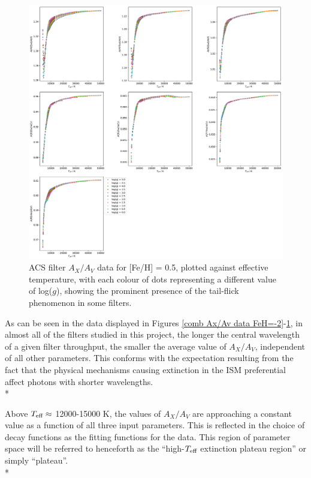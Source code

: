 \documentclass[12pt, a4paper]{report}
\begin{document}
\begin{figure}[h]
\begin{center}
\includegraphics[scale=0.3]{../just_full_data/ACS/AHub_FeH0p5_just_Teff_fit_plot_dots.pdf}
\caption{ACS filter $A_{X}/A_{V}$ data for [Fe/H] = 0.5, plotted against effective temperature, with each colour of dots representing a different value of log($g$), showing the prominent presence of the tail-flick phenomenon in some filters.}
\label{acs Ax/Av data FeH=0}
\end{center}
\end{figure}

As can be seen in the data displayed in Figures \ref{comb Ax/Av data FeH=-2}-\ref{acs Ax/Av data FeH=0}, in almost all of the filters studied in this project, the longer the central wavelength of a given filter throughput, the smaller the average value of $A_{X}/A_{V}$, independent of all other parameters. This conforms with the expectation resulting from the fact that the physical mechanisms causing extinction in the ISM preferential affect photons with shorter wavelengths.\\*

Above $T_{\textnormal{eff}} \approx$ 12000-15000 K, the values of $A_{X}/A_{V}$ are approaching a constant value as a function of all three input parameters. This is reflected in the choice of decay functions as the fitting functions for the data. This region of parameter space will be referred to henceforth as the ``high-$T_{\textnormal{eff}}$ extinction plateau region'' or simply ``plateau''.\\*
\end{document}
